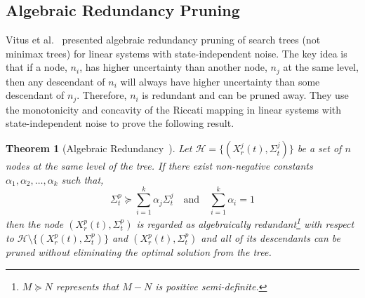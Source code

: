 \documentclass[journal]{IEEEtran}
\newtheorem{theorem}{Theorem}
\begin{document}
%
%       
%    


\subsection{Algebraic Redundancy Pruning}    


Vitus et al.~\cite{vitus2012efficient} presented algebraic redundancy pruning of search trees (not minimax trees) for linear systems with state-independent noise. The key idea is that  if a node, $n_i$, has higher uncertainty than another node, $n_j$ at the same level, then any descendant of $n_i$ will always have higher uncertainty than some descendant of $n_j$. Therefore, $n_i$ is redundant and can be pruned away. They use the monotonicity and concavity of the Riccati mapping in linear systems with state-independent noise to prove the following result. 

\begin{theorem}[Algebraic Redundancy~\cite{vitus2012efficient}]
Let $\mathcal{H} = \{(X^j_r(t),\Sigma^j_t)\}$ be a set of $n$ nodes at the same level of the tree. If there exist non-negative constants $\alpha_1, \alpha_2, \dots, \alpha_k$ such that,
$$   \Sigma^p_t\succeq \sum^k_{i=1}{\alpha_j\Sigma^j_t}\quad \text{and} \quad \sum^k_{i=1}{\alpha_i} = 1$$
then the node $\left(X^p_r(t),\Sigma^p_t\right)$ is regarded as algebraically redundant\footnote{$M \succeq  N$ represents that $M-N$ is positive semi-definite.} with respect to $\mathcal{H}\setminus\{(X^p_r(t),\Sigma^p_t)\}$ and $(X^p_r(t),\Sigma^p_t)$ and all of its descendants can be pruned without eliminating the optimal solution from the tree.
\label{thm:fromvitus}
\end{theorem}
\end{document}
